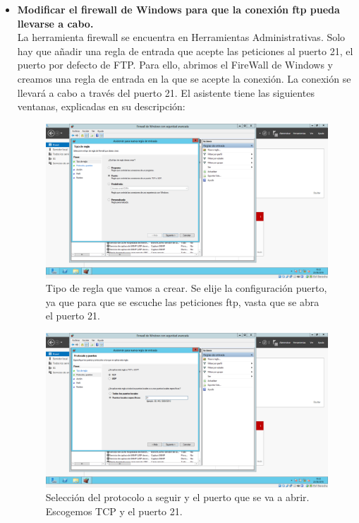 \begin{itemize}
\begin{itemize}
		\item \textbf{Modificar el firewall de Windows para que la conexión ftp pueda llevarse a cabo.}\\
		
		La herramienta firewall se encuentra en Herramientas Administrativas. Solo hay que añadir una regla de entrada que acepte las peticiones al puerto 21, el puerto por defecto de FTP. Para ello, abrimos el FireWall de Windows y creamos una regla de entrada en la que se acepte la conexión. La conexión se llevará a cabo a través del puerto 21. El asistente tiene las siguientes ventanas, explicadas en su descripción:\\
			
		\begin{figure}[H]
			\centering
			\includegraphics[width=0.7\linewidth]{TipoReglaPuerto}
			\caption[Tipo de regla]{Tipo de regla que vamos a crear. Se elije la configuración puerto, ya que para que se escuche las peticiones ftp, vasta que se abra el puerto 21.}
			\label{fig:TipoReglaPuerto}
		\end{figure}
		
		\begin{figure}[H]
			\centering
			\includegraphics[width=0.7\linewidth]{Puerto21}
			\caption[Puerto seleccionado]{Selección del protocolo a seguir y el puerto que se va a abrir. Escogemos TCP y el puerto 21.}
			\label{fig:Puerto21}
		\end{figure}
			

\end{itemize}
\end{itemize}
